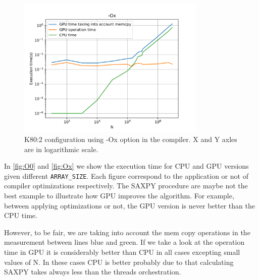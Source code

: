 \documentclass[12pt]{article}
\begin{document}
\begin{figure}[H]
  \centering
  \includegraphics[width=0.8\textwidth]{O1.png}
  \caption{K80:2 configuration using -Ox option in the compiler. X and Y axles are in logarithmic scale.}
  \label{fig:Ox}
  \end{figure}
  
In \autoref{fig:O0} and \autoref{fig:Ox} we show the execution time for CPU and GPU versions given different \texttt{ARRAY\_SIZE}. Each figure correspond to the application or not of compiler optimizations respectively. The SAXPY procedure are maybe not the best example to illustrate how GPU improves the algorithm. For example, between applying optimizations or not, the GPU version is never better than the CPU time. 

However, to be fair, we are taking into account the mem copy operations in the measurement between lines blue and green. If we take a look at the operation time in GPU it is considerably better than CPU in all cases excepting small values of N. In these cases CPU is better probably due to that calculating SAXPY takes always less than the threads orchestration. 
\end{document}
